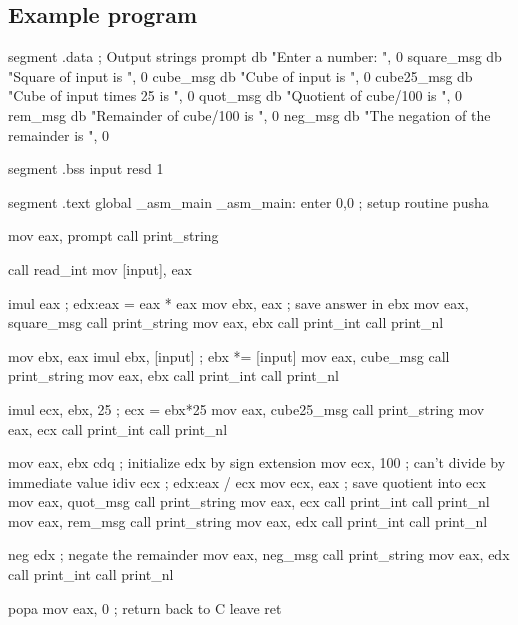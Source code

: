 \subsection{Example program}
\begin{AsmCodeListing}[label=math.asm]
segment .data         ; Output strings
prompt          db    "Enter a number: ", 0
square_msg      db    "Square of input is ", 0
cube_msg        db    "Cube of input is ", 0
cube25_msg      db    "Cube of input times 25 is ", 0
quot_msg        db    "Quotient of cube/100 is ", 0
rem_msg         db    "Remainder of cube/100 is ", 0
neg_msg         db    "The negation of the remainder is ", 0

segment .bss
input   resd 1

segment .text
        global  _asm_main
_asm_main:
        enter   0,0               ; setup routine
	pusha

        mov     eax, prompt
        call    print_string

        call    read_int
        mov     [input], eax

        imul    eax               ; edx:eax = eax * eax
        mov     ebx, eax          ; save answer in ebx
        mov     eax, square_msg
        call    print_string
        mov     eax, ebx
        call    print_int
        call    print_nl

        mov     ebx, eax
        imul    ebx, [input]      ; ebx *= [input]
        mov     eax, cube_msg
        call    print_string
        mov     eax, ebx
        call    print_int
        call    print_nl

        imul    ecx, ebx, 25      ; ecx = ebx*25
        mov     eax, cube25_msg
        call    print_string
        mov     eax, ecx
        call    print_int
        call    print_nl

        mov     eax, ebx
        cdq                       ; initialize edx by sign extension
        mov     ecx, 100          ; can't divide by immediate value
        idiv    ecx               ; edx:eax / ecx
        mov     ecx, eax          ; save quotient into ecx
        mov     eax, quot_msg
        call    print_string
        mov     eax, ecx
        call    print_int
        call    print_nl
        mov     eax, rem_msg
        call    print_string
        mov     eax, edx
        call    print_int
        call    print_nl
        
        neg     edx               ; negate the remainder
        mov     eax, neg_msg
        call    print_string
        mov     eax, edx
        call    print_int
        call    print_nl

        popa
        mov     eax, 0            ; return back to C
        leave                     
        ret
\end{AsmCodeListing}

